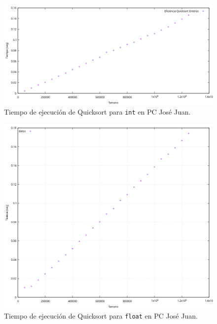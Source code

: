 \documentclass[12pt]{article}
\begin{document}
    \begin{figure}
        \centering
        \includegraphics[width=\linewidth]{images/quicksort/graficas/quicksort-int-puntos.png}
        \cprotect\caption{Tiempo de ejecución de Quicksort para \verb|int| en PC José Juan.}
        \label{fig:Quicksort_int_graf}
    \end{figure}
    \begin{figure}
        \centering
        \includegraphics[width=0.8\linewidth]{images/quicksort/graficas/quicksort-float-puntos.png}
        \cprotect\caption{Tiempo de ejecución de Quicksort para \verb|float| en PC José Juan.}
        \label{fig:Quicksort_float_graf}
    \end{figure}
\end{document}
